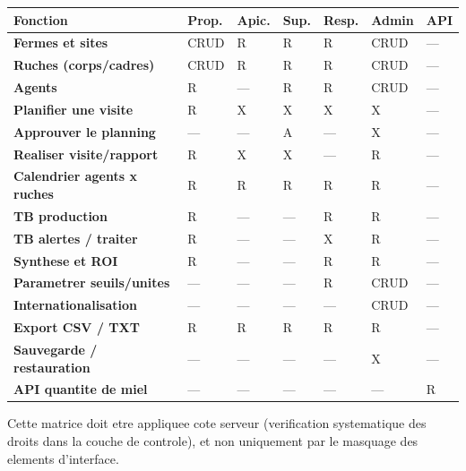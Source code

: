 \begin{longtable}{>{\bfseries}p{3.6cm} C{1.3cm} C{1.3cm} C{1.3cm} C{1.3cm} C{1.3cm} C{1.3cm}}
\toprule
\textbf{Fonction} & \textbf{Prop.} & \textbf{Apic.} & \textbf{Sup.} & \textbf{Resp.} & \textbf{Admin} & \textbf{API} \\
\midrule
\endhead
Fermes et sites          & CRUD & R    & R    & R    & CRUD & --- \\
Ruches (corps/cadres)    & CRUD & R    & R    & R    & CRUD & --- \\
Agents                   & R    & ---  & R    & R    & CRUD & --- \\
Planifier une visite     & R    & X    & X    & X    & X    & --- \\
Approuver le planning    & ---  & ---  & A    & ---  & X    & --- \\
Realiser visite/rapport  & R    & X    & X    & ---  & R    & --- \\
Calendrier agents x ruches & R  & R    & R    & R    & R    & --- \\
TB production            & R    & ---  & ---  & R    & R    & --- \\
TB alertes / traiter     & R    & ---  & ---  & X    & R    & --- \\
Synthese et ROI          & R    & ---  & ---  & R    & R    & --- \\
Parametrer seuils/unites & ---  & ---  & ---  & R    & CRUD & --- \\
Internationalisation     & ---  & ---  & ---  & ---  & CRUD & --- \\
Export CSV / TXT         & R    & R    & R    & R    & R    & --- \\
Sauvegarde / restauration & --- & ---  & ---  & ---  & X    & --- \\
API quantite de miel     & ---  & ---  & ---  & ---  & ---  & R \\
\bottomrule
\end{longtable}

\begin{encadre}
Cette matrice doit etre appliquee cote serveur (verification systematique des
droits dans la couche de controle), et non uniquement par le masquage des
elements d'interface.
\end{encadre}

